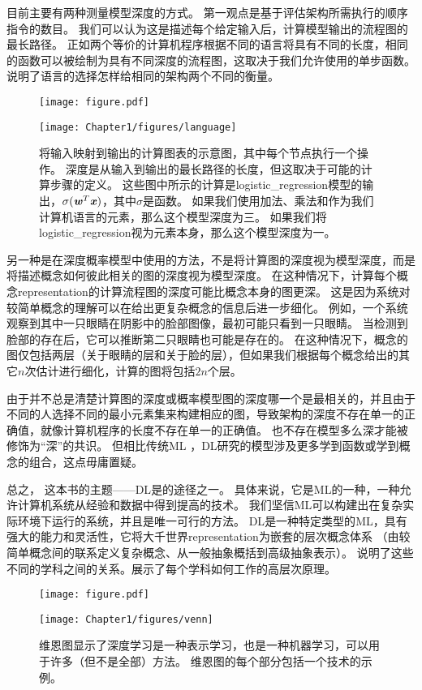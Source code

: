 
目前主要有两种测量模型深度的方式。
第一观点是基于评估架构所需执行的顺序指令的数目。
我们可以认为这是描述每个给定输入后，计算模型输出的流程图的最长路径。
正如两个等价的计算机程序根据不同的语言将具有不同的长度，相同的函数可以被绘制为具有不同深度的流程图，这取决于我们允许使用的单步函数。
说明了语言的选择怎样给相同的架构两个不同的衡量。
\begin{figure}[!htb]
\ifOpenSource
\centerline{\texttt{[image: figure.pdf]}}
\else
\centerline{\texttt{[image: Chapter1/figures/language]}}
\fi
\caption{将输入映射到输出的计算图表的示意图，其中每个节点执行一个操作。
深度是从输入到输出的最长路径的长度，但这取决于可能的计算步骤的定义。
这些图中所示的计算是\gls{logistic_regression}模型的输出，$\sigma(\boldsymbol{\mathit{w}}^T \boldsymbol{\mathit{x}})$，其中$\sigma$是函数。
如果我们使用加法、乘法和作为我们计算机语言的元素，那么这个模型深度为三。
如果我们将\gls{logistic_regression}视为元素本身，那么这个模型深度为一。
}
\label{fig:chap1_language}
\end{figure}

另一种是在深度概率模型中使用的方法，不是将计算图的深度视为模型深度，而是将描述概念如何彼此相关的图的深度视为模型深度。
在这种情况下，计算每个概念\gls{representation}的计算流程图的深度可能比概念本身的图更深。
这是因为系统对较简单概念的理解可以在给出更复杂概念的信息后进一步细化。
例如，一个系统观察到其中一只眼睛在阴影中的脸部图像，最初可能只看到一只眼睛。
当检测到脸部的存在后，它可以推断第二只眼睛也可能是存在的。
在这种情况下，概念的图仅包括两层（关于眼睛的层和关于脸的层），但如果我们根据每个概念给出的其它$n$次估计进行细化，计算的图将包括$2n$个层。


由于并不总是清楚计算图的深度或概率模型图的深度哪一个是最相关的，并且由于不同的人选择不同的最小元素集来构建相应的图，导致架构的深度不存在单一的正确值，就像计算机程序的长度不存在单一的正确值。
也不存在模型多么深才能被修饰为``深''的共识。
但相比传统\gls{ML} ，\gls{DL}研究的模型涉及更多学到函数或学到概念的组合，这点毋庸置疑。

总之， 这本书的主题——\gls{DL}是的途径之一。
具体来说，它是\gls{ML}的一种，一种允许计算机系统从经验和数据中得到提高的技术。
我们坚信\gls{ML}可以构建出在复杂实际环境下运行的系统，并且是唯一可行的方法。
\gls{DL}是一种特定类型的\gls{ML}，具有强大的能力和灵活性，它将大千世界\gls{representation}为嵌套的层次概念体系
（由较简单概念间的联系定义复杂概念、从一般抽象概括到高级抽象表示）。
说明了这些不同的学科之间的关系。展示了每个学科如何工作的高层次原理。
\begin{figure}[!hbt]
\ifOpenSource
\centerline{\texttt{[image: figure.pdf]}}
\else
\centerline{\texttt{[image: Chapter1/figures/venn]}}
\fi
\caption{维恩图显示了深度学习是一种表示学习，也是一种机器学习，可以用于许多（但不是全部）方法。
维恩图的每个部分包括一个技术的示例。
}
\label{fig:chap1_venn}
\end{figure}

